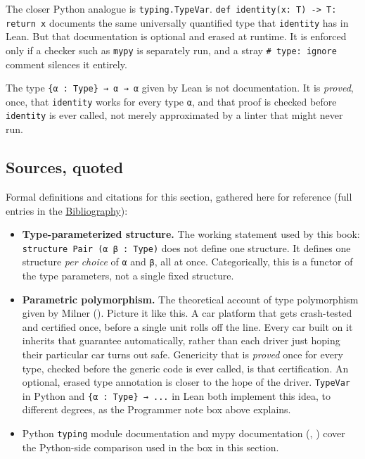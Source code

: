The closer Python analogue is \texttt{typing.TypeVar}. \texttt{def identity(x: T) -\allowbreak{}> T: return x} documents the same universally quantified type that \texttt{identity} has in Lean. But that documentation is optional and erased at runtime. It is enforced only if a checker such as \texttt{mypy} is separately run, and a stray \texttt{\# type: ignore} comment silences it entirely.

The type \texttt{\{α : Type\} → α → α} given by Lean is not documentation. It is \emph{proved}, once, that \texttt{identity} works for every type \texttt{α}, and that proof is checked before \texttt{identity} is ever called, not merely approximated by a linter that might never run.

\subsection{Sources, quoted}\label{sec:03-functions-and-structures:02-type-parameters:2}

Formal definitions and citations for this section, gathered here for reference (full entries in the \hyperref[sec:root:bibliography:1]{Bibliography}):

\begin{itemize}
\tightlist
\item
  \textbf{Type-parameterized structure.} The working statement used by this book: \texttt{structure Pair (α β : Type)} does not define one structure. It defines one structure \emph{per choice} of \texttt{α} and \texttt{β}, all at once. Categorically, this is a functor of the type parameters, not a single fixed structure.
\item
  \textbf{Parametric polymorphism.} The theoretical account of type polymorphism given by Milner (\cite{Milner1978}). Picture it like this. A car platform that gets crash-tested and certified once, before a single unit rolls off the line. Every car built on it inherits that guarantee automatically, rather than each driver just hoping their particular car turns out safe. Genericity that is \emph{proved} once for every type, checked before the generic code is ever called, is that certification. An optional, erased type annotation is closer to the hope of the driver. \texttt{TypeVar} in Python and \texttt{\{α : Type\} → ...} in Lean both implement this idea, to different degrees, as the Programmer note box above explains.
\item
  Python \texttt{typing} module documentation and mypy documentation (\cite{PythonTyping}, \cite{MypyDocs}) cover the Python-side comparison used in the box in this section.
\end{itemize}
